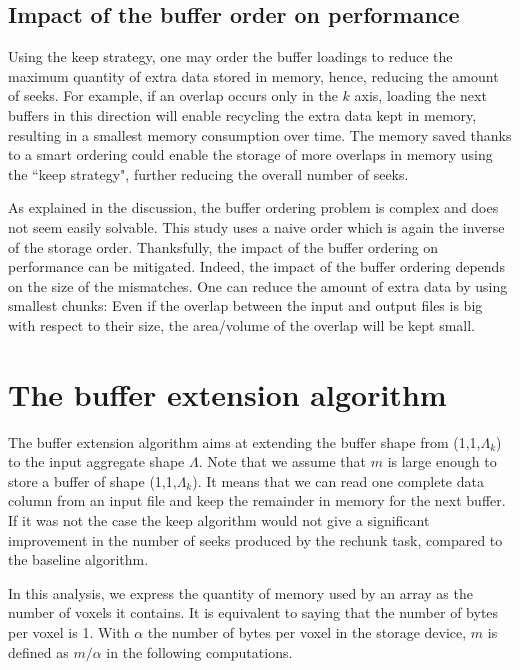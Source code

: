 \documentclass[conference]{IEEEtran}
\begin{document}
\subsection{Impact of the buffer order on performance}
Using the keep strategy, one may order the buffer loadings to reduce the maximum
quantity of extra data stored in memory, hence, reducing the amount of seeks.
For example, if an overlap occurs only in the $k$ axis, loading the next buffers
in this direction will enable recycling the extra data kept in memory, resulting
in a smallest memory consumption over time. The memory saved thanks to a smart
ordering could enable the storage of more overlaps in memory using the
``keep strategy", further reducing the overall number of seeks.

As explained in the discussion, the buffer ordering problem is complex and does
not seem easily solvable.
This study uses a naive order which is again the inverse of the storage order.
Thanksfully, the impact of the buffer ordering on performance can be
mitigated. Indeed, the impact of the buffer ordering depends on the size of the
mismatches. One can reduce the amount of extra data by using smallest chunks: Even
if the overlap between the input and output files is big with respect to their
size, the area/volume of the overlap will be kept small.

\section{The buffer extension algorithm}

The buffer extension algorithm aims at extending the buffer shape from
(1,1,$\Lambda_k$) to the input aggregate shape $\Lambda$. Note that we assume
that $m$ is large enough to store a buffer of shape (1,1,$\Lambda_k$). It means
that we can read one complete data column from an input file and keep the
remainder in memory for the next buffer. If it was not the case the keep
algorithm would not give a significant improvement in the number of seeks
produced by the rechunk task, compared to the baseline algorithm.

In this analysis, we express the quantity of memory used by an array as the
number of voxels it contains. It is equivalent to saying that the number of
bytes per voxel is 1. With $\alpha$ the number of bytes per voxel in the storage
device, $m$ is defined as $m/\alpha$ in the following computations.
\end{document}
